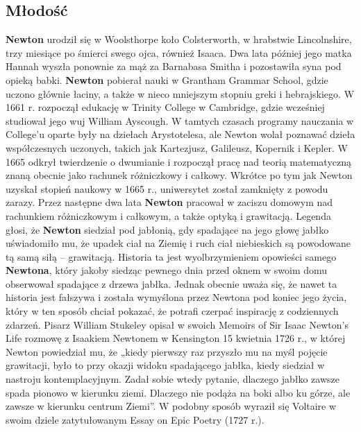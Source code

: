 \documentclass{article}
\begin{document}
\subsection{Młodość}
\textbf{Newton} urodził się w Woolsthorpe koło Colsterworth, w hrabstwie Lincolnshire, trzy miesiące po śmierci swego ojca, również Isaaca. Dwa lata później jego matka Hannah wyszła ponownie za mąż za Barnabasa Smitha i pozostawiła syna pod opieką babki.\newline
\textbf{Newton} pobierał nauki w Grantham Grammar School, gdzie uczono głównie łaciny, a także w nieco mniejszym stopniu greki i hebrajskiego. W 1661 r. rozpoczął edukację w Trinity College w Cambridge, gdzie wcześniej studiował jego wuj William Ayscough. W tamtych czasach programy nauczania w College’u oparte były na dziełach Arystotelesa, ale Newton wolał poznawać dzieła współczesnych uczonych, takich jak Kartezjusz, Galileusz, Kopernik i Kepler. W 1665 odkrył twierdzenie o dwumianie i rozpoczął pracę nad teorią matematyczną znaną obecnie jako rachunek różniczkowy i całkowy. Wkrótce po tym jak Newton uzyskał stopień naukowy w 1665 r., uniwersytet został zamknięty z powodu zarazy. Przez następne dwa lata \textbf{Newton} pracował w zaciszu domowym nad rachunkiem różniczkowym i całkowym, a także optyką i grawitacją.\newline
Legenda głosi, że \textbf{Newton} siedział pod jabłonią, gdy spadające na jego głowę jabłko uświadomiło mu, że upadek ciał na Ziemię i ruch ciał niebieskich są powodowane tą samą siłą – grawitacją. Historia ta jest wyolbrzymieniem opowieści samego \textbf{Newtona}, który jakoby siedząc pewnego dnia przed oknem w swoim domu obserwował spadające z drzewa jabłka. Jednak obecnie uważa się, że nawet ta historia jest fałszywa i została wymyślona przez Newtona pod koniec jego życia, który w ten sposób chciał pokazać, że potrafi czerpać inspirację z codziennych zdarzeń. Pisarz William Stukeley opisał w swoich Memoirs of Sir Isaac Newton’s Life rozmowę z Isaakiem Newtonem w Kensington 15 kwietnia 1726 r., w której Newton powiedział mu, że „kiedy pierwszy raz przyszło mu na myśl pojęcie grawitacji, było to przy okazji widoku spadającego jabłka, kiedy siedział w nastroju kontemplacyjnym. Zadał sobie wtedy pytanie, dlaczego jabłko zawsze spada pionowo w kierunku ziemi. Dlaczego nie podąża na boki albo ku górze, ale zawsze w kierunku centrum Ziemi”. W podobny sposób wyraził się Voltaire w swoim dziele zatytułowanym Essay on Epic Poetry (1727 r.).

\newpage
\tableofcontents
\end{document}
